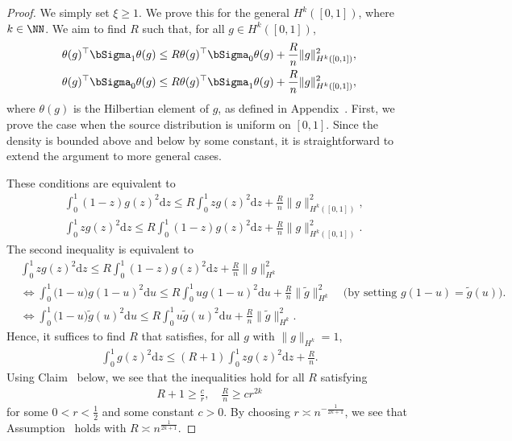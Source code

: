 \documentclass[12pt,a4paper,pdftex,onepage]{article}
\newcommand{\de}{\mathrm{d}}
\newcommand{\Sigmatreated}{\bSigma_{1}}
\newcommand{\Sigmacontrol}{\bSigma_{0}}
\begin{document}
\begin{proof}
We simply set \(\xi \geq 1\). 
We prove this for the general \(H^k([0,1])\), where \(k \in \NN\).
We aim to find \(R\) such that, for all \(g \in H^k([0,1])\),
\begin{align*}
\theta(g)^\top \Sigmatreated \theta(g) &\leq R \theta(g)^\top \Sigmacontrol \theta(g) 
+ \frac{R}{n}\|g\|_{H^k([0,1])}^2, 
\\
\theta(g)^\top \Sigmacontrol \theta(g) &\leq R \theta(g)^\top \Sigmatreated \theta(g) 
+ \frac{R}{n}\|g\|_{H^k([0,1])}^2,
\end{align*}
where \(\theta(g)\) is the Hilbertian element of \(g\), as defined in Appendix~.
First, we prove the case when the source distribution is uniform on \([0,1]\).
Since the density is bounded above and below by some constant, it is straightforward to extend the argument to more general cases.

These conditions are equivalent to 
\begin{align*}
&\int_0^1 (1-z)g(z)^2 \de z 
\leq R \int_0^1 zg(z)^2 \de z 
+ \frac{R}{n}\|g\|_{H^k([0,1])}^2,  
\\
&\int_0^1 zg(z)^2 \de z 
\leq R \int_0^1 (1-z)g(z)^2 \de z  
+ \frac{R}{n}\|g\|_{H^k([0,1])}^2.
\end{align*}
The second inequality is equivalent to
\begin{align*}
&\int_0^1  z g(z)^2 \de z 
\leq R \int_0^1 (1-z)g(z)^2 \de z  
+ \frac{R}{n}\|g\|_{H^k}^2 
\\
&\Leftrightarrow   
\int_0^1  \bigl(1-u\bigr) g(1-u)^2 \de u 
\leq R \int_0^1 ug(1-u)^2 \de u  
+ \frac{R}{n}\|\tilde{g}\|_{H^k}^2  \quad \bigl(\text{by setting } g(1-u) = \tilde{g}(u)\bigr).
\\
&\Leftrightarrow  
\int_0^1  \bigl(1-u\bigr)\tilde{g}(u)^2 \de u 
\leq R \int_0^1 u\tilde{g}(u)^2 \de u  
+ \frac{R}{n}\|\tilde{g}\|_{H^k}^2.
\end{align*}
Hence, it suffices to find \(R\) that satisfies, for all \(g\) with \(\|g\|_{H^k}=1\),
\begin{align*}
\int_0^1 g(z)^2 \de z 
\leq (R+1)\int_0^1 zg(z)^2 \de z  
+ \frac{R}{n}.
\end{align*}
Using Claim~ below, we see that the inequalities hold for all \(R\) satisfying
\begin{align*}
R +1 \geq \frac{c}{r}, 
\quad  
\frac{R}{n} \geq cr^{2k}
\end{align*}
for some \(0< r <\frac{1}{2}\) and some constant \(c>0\).
By choosing \(r \asymp n^{-\frac{1}{2k+1}}\), we see that Assumption~ holds with \(R \asymp n^{\frac{1}{2k+1}}\).    
\end{proof}
\end{document}
